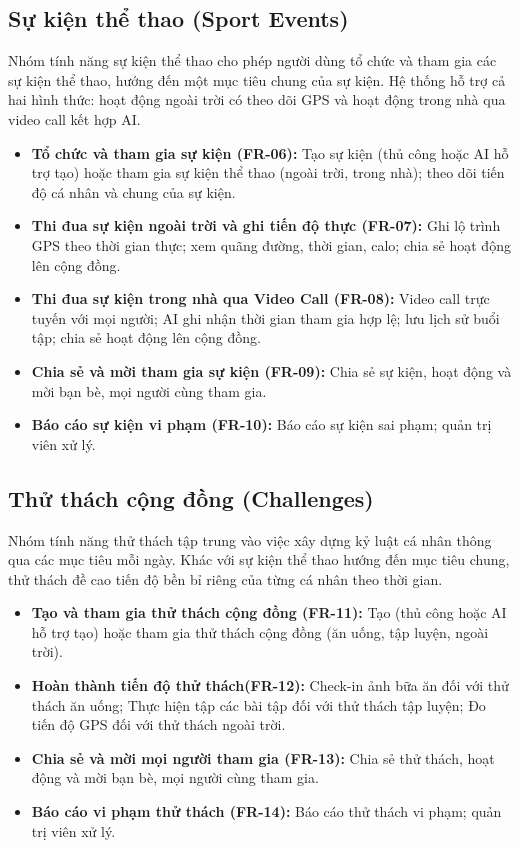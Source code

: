 \subsection{Sự kiện thể thao (Sport Events)}
Nhóm tính năng sự kiện thể thao cho phép người dùng tổ chức và tham gia các sự kiện thể thao, hướng đến một mục tiêu chung của sự kiện. Hệ thống hỗ trợ cả hai hình thức: hoạt động ngoài trời có theo dõi GPS và hoạt động trong nhà qua video call kết hợp AI.
\begin{itemize}
    \item \textbf{Tổ chức và tham gia sự kiện (FR-06):} Tạo sự kiện (thủ công hoặc AI hỗ trợ tạo) hoặc tham gia sự kiện thể thao (ngoài trời, trong nhà); theo dõi tiến độ cá nhân và chung của sự kiện.
    \item \textbf{Thi đua sự kiện ngoài trời và ghi tiến độ thực (FR-07):} Ghi lộ trình GPS theo thời gian thực; xem quãng đường, thời gian, calo; chia sẻ hoạt động lên cộng đồng.
    \item \textbf{Thi đua sự kiện trong nhà qua Video Call (FR-08):} Video call trực tuyến với mọi người; AI ghi nhận thời gian tham gia hợp lệ; lưu lịch sử buổi tập; chia sẻ hoạt động lên cộng đồng.
    \item \textbf{Chia sẻ và mời tham gia sự kiện (FR-09):} Chia sẻ sự kiện, hoạt động và mời bạn bè, mọi người cùng tham gia.
    \item \textbf{Báo cáo sự kiện vi phạm (FR-10):} Báo cáo sự kiện sai phạm; quản trị viên xử lý.
\end{itemize}

\subsection{Thử thách cộng đồng (Challenges)}
Nhóm tính năng thử thách tập trung vào việc xây dựng kỷ luật cá nhân thông qua các mục tiêu mỗi ngày. Khác với sự kiện thể thao hướng đến mục tiêu chung, thử thách đề cao tiến độ bền bỉ riêng của từng cá nhân theo thời gian.
\begin{itemize}
    \item \textbf{Tạo và tham gia thử thách cộng đồng (FR-11):} Tạo (thủ công hoặc AI hỗ trợ tạo) hoặc tham gia thử thách cộng đồng (ăn uống, tập luyện, ngoài trời).
    \item \textbf{Hoàn thành tiến độ thử thách(FR-12):} Check-in ảnh bữa ăn đối với thử thách ăn uống; Thực hiện tập các bài tập đối với thử thách tập luyện; Đo tiến độ GPS đối với thử thách ngoài trời.
    \item \textbf{Chia sẻ và mời mọi người tham gia (FR-13):} Chia sẻ thử thách, hoạt động và mời bạn bè, mọi người cùng tham gia.
    \item \textbf{Báo cáo vi phạm thử thách (FR-14):} Báo cáo thử thách vi phạm; quản trị viên xử lý.
\end{itemize}

